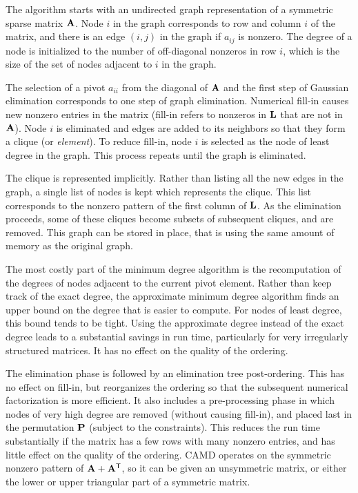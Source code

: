 \documentclass[11pt]{article}
\newcommand{\m}[1]{{\bf{#1}}}       %
\newcommand{\tr}{^{\sf T}}          %
\begin{document}
The algorithm starts with an undirected graph representation of a
symmetric sparse matrix $\m{A}$.  Node $i$ in the graph corresponds to row
and column $i$ of the matrix, and there is an edge $(i,j)$ in the graph if
$a_{ij}$ is nonzero.
The degree of a node is initialized to the number of off-diagonal nonzeros
in row $i$, which is the size of the set of nodes
adjacent to $i$ in the graph.

The selection of a pivot $a_{ii}$ from the diagonal of $\m{A}$ and the first
step of Gaussian elimination corresponds to one step of graph elimination.
Numerical fill-in causes new nonzero entries in the matrix
(fill-in refers to
nonzeros in $\m{L}$ that are not in $\m{A}$).
Node $i$ is eliminated and edges are added to its neighbors
so that they form a clique (or {\em element}).  To reduce fill-in,
node $i$ is selected as the node of least degree in the graph.
This process repeats until the graph is eliminated.

The clique is represented implicitly.  Rather than listing all the
new edges in the graph, a single list of nodes is kept which represents
the clique.  This list corresponds to the nonzero pattern of the first
column of $\m{L}$.  As the elimination proceeds, some of these cliques
become subsets of subsequent cliques, and are removed.   This graph
can be stored in place, that is
using the same amount of memory as the original graph.

The most costly part of the minimum degree algorithm is the recomputation
of the degrees of nodes adjacent to the current pivot element.
Rather than keep track of the exact degree, the approximate minimum degree
algorithm finds an upper bound on the degree that is easier to compute.
For nodes of least degree, this bound tends to be tight.  Using the
approximate degree instead of the exact degree leads to a substantial savings
in run time, particularly for very irregularly structured matrices.
It has no effect on the quality of the ordering.

The elimination phase is followed by an
elimination tree post-ordering.  This has no effect on fill-in, but
reorganizes the ordering so that the subsequent numerical factorization is
more efficient.  It also includes a pre-processing phase in which nodes of
very high degree are removed (without causing fill-in), and placed last in the
permutation $\m{P}$ (subject to the constraints).
This reduces the run time substantially if the matrix
has a few rows with many nonzero entries, and has little effect on the quality
of the ordering.
CAMD operates on the
symmetric nonzero pattern of $\m{A}+\m{A}\tr$, so it can be given
an unsymmetric matrix, or either the lower or upper triangular part of
a symmetric matrix.
\end{document}
